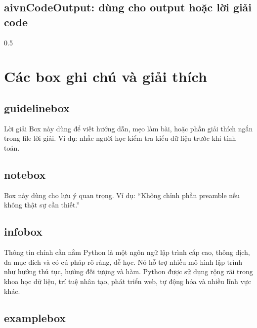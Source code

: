 \documentclass[12pt]{article}
\begin{document}
\subsection{aivnCodeOutput: dùng cho output hoặc lời giải code}

\begin{aivnCodeOutput}
\begin{python}
0.5
\end{python}
\end{aivnCodeOutput}

\section{Các box ghi chú và giải thích}

\subsection{guidelinebox}

\begin{guidelinebox}{Lời giải}
Box này dùng để viết hướng dẫn, mẹo làm bài, hoặc phần giải thích ngắn trong file lời giải. Ví dụ: nhắc người học kiểm tra kiểu dữ liệu trước khi tính toán.
\end{guidelinebox}

\subsection{notebox}

\begin{notebox}
Box này dùng cho lưu ý quan trọng. Ví dụ: ``Không chỉnh phần preamble nếu không thật sự cần thiết.''
\end{notebox}

\subsection{infobox}

\begin{infobox}{Thông tin chính cần nắm}
Python là một ngôn ngữ lập trình cấp cao, thông dịch, đa mục đích và có cú pháp rõ ràng, dễ học. Nó hỗ trợ nhiều mô hình lập trình như hướng thủ tục, hướng đối tượng và hàm. Python được sử dụng rộng rãi trong khoa học dữ liệu, trí tuệ nhân tạo, phát triển web, tự động hóa và nhiều lĩnh vực khác.
\end{infobox}

\subsection{examplebox}
\end{document}
